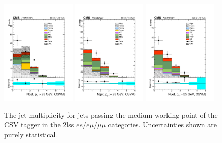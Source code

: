 \begin{figure}[htp]
\centering
\includegraphics[width=0.32\textwidth]{ch5_figs/nJets_CSVM_ttH_ee_stackPlot_SR.pdf}
\includegraphics[width=0.32\textwidth]{ch5_figs/nJets_CSVM_ttH_em_stackPlot_SR.pdf}
\includegraphics[width=0.32\textwidth]{ch5_figs/nJets_CSVM_ttH_mm_stackPlot_SR.pdf} \\
\caption[Data/MC comparison of the CSVM jet multiplicity in the signal region]{The jet multiplicity for jets passing the medium working point of the CSV tagger in the 2lss $ee$/$e\mu$/$\mu\mu$ categories. Uncertainties shown are purely statistical.}
\label{fig:sr_njets_csvm}
\end{figure}

